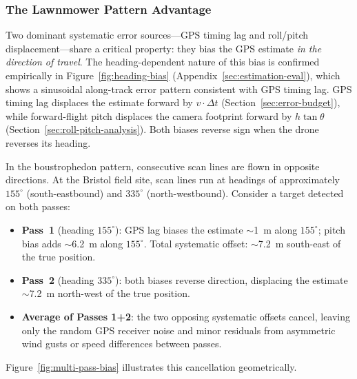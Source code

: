 \subsubsection{The Lawnmower Pattern Advantage}

Two dominant systematic error sources---GPS timing lag and roll/pitch displacement---share a critical property: they bias the GPS estimate \emph{in the direction of travel}.  The heading-dependent nature of this bias is confirmed empirically in Figure~\ref{fig:heading-bias} (Appendix~\ref{sec:estimation-eval}), which shows a sinusoidal along-track error pattern consistent with GPS timing lag.  GPS timing lag displaces the estimate forward by $v \cdot \Delta t$ (Section~\ref{sec:error-budget}), while forward-flight pitch displaces the camera footprint forward by $h\tan\theta$ (Section~\ref{sec:roll-pitch-analysis}).  Both biases reverse sign when the drone reverses its heading.

In the boustrophedon pattern, consecutive scan lines are flown in opposite directions.  At the Bristol field site, scan lines run at headings of approximately $155^{\circ}$ (south-eastbound) and $335^{\circ}$ (north-westbound).  Consider a target detected on both passes:

\begin{itemize}
  \item \textbf{Pass~1} (heading $155^{\circ}$): GPS lag biases the estimate $\sim$\SI{1}{\metre} along $155^{\circ}$; pitch bias adds $\sim$\SI{6.2}{\metre} along $155^{\circ}$.  Total systematic offset: $\sim$\SI{7.2}{\metre} south-east of the true position.
  \item \textbf{Pass~2} (heading $335^{\circ}$): both biases reverse direction, displacing the estimate $\sim$\SI{7.2}{\metre} north-west of the true position.
  \item \textbf{Average of Passes 1+2}: the two opposing systematic offsets cancel, leaving only the random GPS receiver noise and minor residuals from asymmetric wind gusts or speed differences between passes.
\end{itemize}

\noindent Figure~\ref{fig:multi-pass-bias} illustrates this cancellation geometrically.

